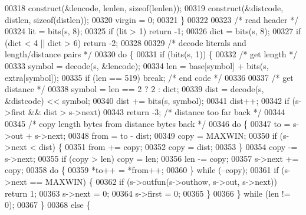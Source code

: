 \begin{DoxyCode}
00318         construct(&lencode, lenlen, \textcolor{keyword}{sizeof}(lenlen));
00319         construct(&distcode, distlen, \textcolor{keyword}{sizeof}(distlen));
00320         virgin = 0;
00321     \}
00322 
00323     \textcolor{comment}{/* read header */}
00324     lit = bits(s, 8);
00325     \textcolor{keywordflow}{if} (lit > 1) \textcolor{keywordflow}{return} -1;
00326     dict = bits(s, 8);
00327     \textcolor{keywordflow}{if} (dict < 4 || dict > 6) \textcolor{keywordflow}{return} -2;
00328 
00329     \textcolor{comment}{/* decode literals and length/distance pairs */}
00330     \textcolor{keywordflow}{do} \{
00331         \textcolor{keywordflow}{if} (bits(s, 1)) \{
00332             \textcolor{comment}{/* get length */}
00333             symbol = decode(s, &lencode);
00334             len = base[symbol] + bits(s, extra[symbol]);
00335             \textcolor{keywordflow}{if} (len == 519) \textcolor{keywordflow}{break};              \textcolor{comment}{/* end code */}
00336 
00337             \textcolor{comment}{/* get distance */}
00338             symbol = len == 2 ? 2 : dict;
00339             dist = decode(s, &distcode) << symbol;
00340             dist += bits(s, symbol);
00341             dist++;
00342             \textcolor{keywordflow}{if} (s->first && dist > s->next)
00343                 \textcolor{keywordflow}{return} -3;              \textcolor{comment}{/* distance too far back */}
00344 
00345             \textcolor{comment}{/* copy length bytes from distance bytes back */}
00346             \textcolor{keywordflow}{do} \{
00347                 to = s->out + s->next;
00348                 from = to - dist;
00349                 copy = MAXWIN;
00350                 \textcolor{keywordflow}{if} (s->next < dist) \{
00351                     from += copy;
00352                     copy = dist;
00353                 \}
00354                 copy -= s->next;
00355                 \textcolor{keywordflow}{if} (copy > len) copy = len;
00356                 len -= copy;
00357                 s->next += copy;
00358                 \textcolor{keywordflow}{do} \{
00359                     *to++ = *from++;
00360                 \} \textcolor{keywordflow}{while} (--copy);
00361                 \textcolor{keywordflow}{if} (s->next == MAXWIN) \{
00362                     \textcolor{keywordflow}{if} (s->outfun(s->outhow, s->out, s->next)) \textcolor{keywordflow}{return} 1;
00363                     s->next = 0;
00364                     s->first = 0;
00365                 \}
00366             \} \textcolor{keywordflow}{while} (len != 0);
00367         \}
00368         \textcolor{keywordflow}{else} \{

\end{DoxyCode}

